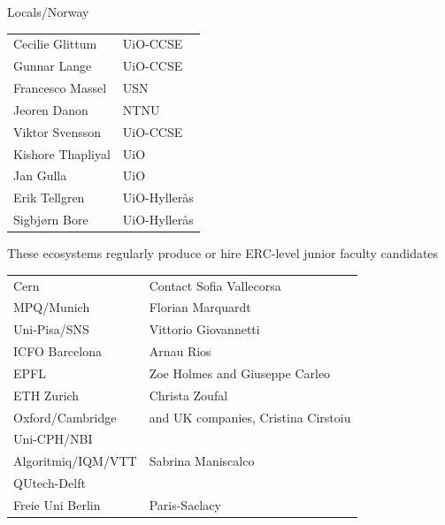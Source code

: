 \documentclass{beamer}
\begin{document}
\begin{frame}{Locals/Norway}
\small
\begin{tabular}{p{} p{}}
Cecilie Glittum  & UiO-CCSE \\[0.2cm]
Gunnar Lange  & UiO-CCSE \\[0.2cm]
Francesco Massel  & USN \\[0.2cm]
Jeoren Danon  & NTNU\\[0.2cm]
Viktor Svensson  & UiO-CCSE \\[0.2cm]
Kishore Thapliyal  & UiO \\[0.2cm]
Jan Gulla & UiO \\[0.2cm]
Erik Tellgren  & UiO-Hyllerås \\[0.2cm]
Sigbjørn Bore  & UiO-Hyllerås \\[0.2cm]
\end{tabular}
\end{frame}



\begin{frame}{These ecosystems regularly produce or hire ERC-level junior faculty candidates}
\small
\begin{tabular}{p{} p{}}
Cern  & Contact Sofia Vallecorsa\\[0.2cm]
MPQ/Munich  & Florian Marquardt\\[0.2cm]
Uni-Pisa/SNS  & Vittorio Giovannetti\\[0.2cm]
ICFO Barcelona  & Arnau Rios\\[0.2cm]
EPFL  & Zoe Holmes and Giuseppe Carleo\\[0.2cm]
ETH Zurich  & Christa Zoufal\\[0.2cm]
Oxford/Cambridge  & and UK companies, Cristina Cirstoiu\\[0.2cm]
Uni-CPH/NBI  & \\[0.2cm]
Algoritmiq/IQM/VTT & Sabrina Maniscalco \\[0.2cm]
QUtech-Delft   & \\[0.2cm]
Freie Uni Berlin & Paris-Saclacy \\[0.2cm]
\end{tabular}
\end{frame}
\end{document}
